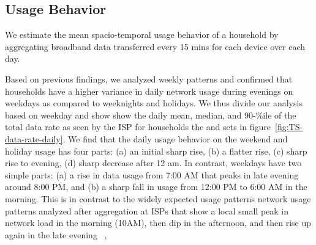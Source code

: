 \subsection{Usage Behavior}
\label{subsec:behavior}

We estimate the mean spacio-temporal usage behavior of a household by aggregating broadband data transferred every 15 mins for each device over each day.



Based on previous findings, we analyzed weekly patterns and confirmed that households have a higher variance in daily network usage during evenings on weekdays as compared to weeknights and holidays. We thus divide our analysis based on weekday and show show the daily mean, median, and 90-\%ile of the total data rate as seen by the ISP for households the \control and \test sets in figure~\ref{fig:TS-data-rate-daily}. We find that the daily usage behavior on the weekend and holiday usage has four parts: (a) an initial sharp rise, (b) a flatter rise, (c) sharp rise to evening, (d) sharp decrease after 12 am.
In contrast, weekdays have two simple parts: (a) a rise in data usage from 7:00 AM that peaks in late evening around 8:00 PM, and (b) a sharp fall in usage from 12:00 PM to 6:00 AM in the morning. This is in contrast to the widely expected usage patterns network usage patterns analyzed after aggregation at ISPs that show a local small peak in network load in the morning (10AM), then dip in the afternoon, and then rise up again in the late evening ~\cite{sandvine2014report1}, 


